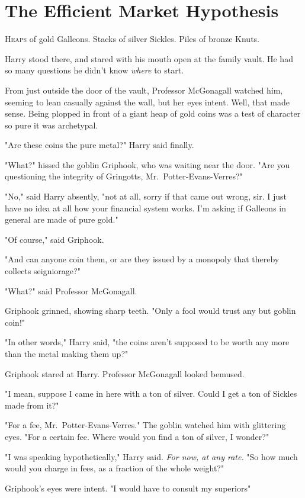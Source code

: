\chapter{The Efficient Market Hypothesis}

\lettrine{H}{eaps} of gold Galleons. Stacks of silver Sickles. Piles of bronze Knuts.

\quad\quad
Harry stood there, and stared with his mouth open at the family vault. He had
so many questions he didn't know \emph{where} to start.

From just outside the door of the vault, Professor McGonagall watched him,
seeming to lean casually against the wall, but her eyes intent. Well, that made
sense. Being plopped in front of a giant heap of gold coins was a test of
character so pure it was archetypal.

"Are these coins the pure metal?" Harry said finally.

"What?" hissed the goblin Griphook, who was waiting near the door. "Are you
questioning the integrity of Gringotts, Mr.~Potter-Evans-Verres?"

"No," said Harry absently, "not at all, sorry if that came out wrong, sir. I
just have no idea at all how your financial system works. I'm asking if
Galleons in general are made of pure gold."

"Of course," said Griphook.

"And can anyone coin them, or are they issued by a monopoly that thereby
collects seigniorage?"

"What?" said Professor McGonagall.

Griphook grinned, showing sharp teeth. "Only a fool would trust any but goblin
coin!"

"In other words," Harry said, "the coins aren't supposed to be worth any more
than the metal making them up?"

Griphook stared at Harry. Professor McGonagall looked bemused.

"I mean, suppose I came in here with a ton of silver. Could I get a ton of
Sickles made from it?"

"For a fee, Mr.~Potter-Evans-Verres." The goblin watched him with glittering
eyes. "For a certain fee. Where would you find a ton of silver, I wonder?"

"I was speaking hypothetically," Harry said. \emph{For now, at any rate.}
"So{\el} how much would you charge in fees, as a fraction of the whole
weight?"

Griphook's eyes were intent. "I would have to consult my superiors{\el}"


